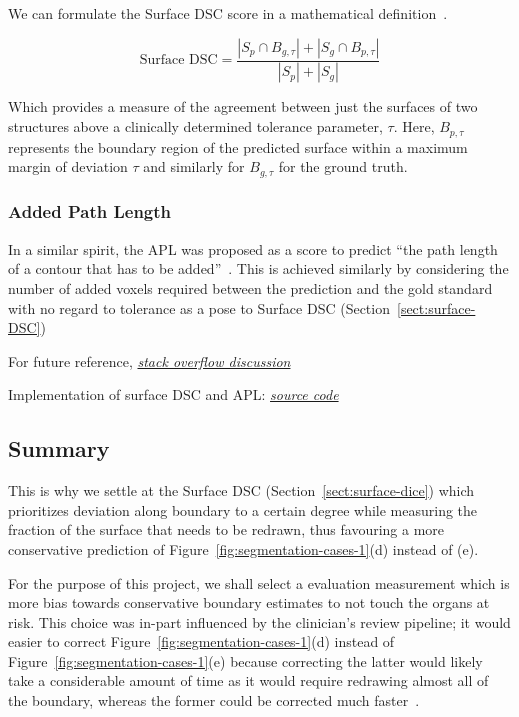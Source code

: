 \documentclass[12pt,twoside]{report}
\begin{document}
We can formulate the Surface DSC score in a mathematical definition~\cite{Sherer2021-le}.

\begin{equation*}
  \text{Surface DSC} = \frac{|S_p \cap B_{g,\tau}| + |S_g \cap B_{p,\tau}|}{|S_p| + |S_g|}
\end{equation*}

Which provides a measure of the agreement between just the surfaces of two structures above a clinically determined tolerance parameter, $\tau$. Here, $B_{p,\tau}$ represents the  boundary region of the predicted surface within a maximum margin of deviation $\tau$ and similarly for $B_{g,\tau}$ for the ground truth.

\subsubsection{Added Path Length}

In a similar spirit, the APL was proposed as a score to predict ``the path length of a contour that has to be added''~\cite{APL}. This is achieved similarly by considering the number of added voxels required between the prediction and the gold standard with no regard to tolerance as a pose to Surface DSC (Section~\ref{sect:surface-DSC})

\begin{warning}
  For future reference, \textit{\href{https://stackoverflow.com/questions/73286639/how-to-calculate-added-path-length-apl-image-segmentation-metric}{stack overflow discussion}}

  Implementation of surface DSC and APL: \textit{\href{https://github.com/pyplati/platipy/blob/master/platipy/imaging/label/comparison.py}{source code}}
\end{warning}

\subsection{Summary}

This is why we settle at the Surface DSC (Section~\ref{sect:surface-dice}) which prioritizes deviation along boundary to a certain degree while measuring the fraction of the surface that needs to be redrawn, thus favouring a more conservative prediction of Figure~\ref{fig:segmentation-cases-1}(d) instead of (e).

For the purpose of this project, we shall select a evaluation measurement which is more bias towards conservative boundary estimates to not touch the organs at risk. This choice was in-part influenced by the clinician's review pipeline; it would easier to correct Figure~\ref{fig:segmentation-cases-1}(d) instead of Figure~\ref{fig:segmentation-cases-1}(e) because correcting the latter would likely take a considerable amount of time as it would require redrawing almost all of the boundary, whereas the former could be corrected much faster~\cite{Nikolov2021-xe}.
\end{document}
